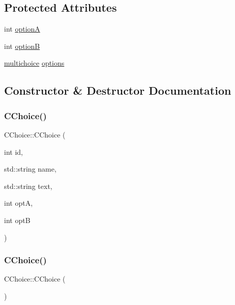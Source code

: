 \subsection*{Protected Attributes}
\begin{DoxyCompactItemize}
\item 
int \mbox{\hyperlink{class_c_choice_abca7c10fc012acfb1145ae7524050bc5}{optionA}}
\item 
int \mbox{\hyperlink{class_c_choice_a6343fc4edf568af23978d9df5f4b94b5}{optionB}}
\item 
\mbox{\hyperlink{_game_menus_8h_acdb545ed67596d0840e35ed209fecbe9}{multichoice}} \mbox{\hyperlink{class_c_choice_a80f4aa4ea3bb2ff9ae3f9e45fcc921ce}{options}}
\end{DoxyCompactItemize}


\subsection{Constructor \& Destructor Documentation}
\mbox{\label{class_c_choice_a41af6b55945769cf785d9de68fe43d6b}} 
\subsubsection{\texorpdfstring{C\+Choice()}{CChoice()}\hspace{0.1cm}{\footnotesize\ttfamily [1/2]}}
{\footnotesize\ttfamily C\+Choice\+::\+C\+Choice (\begin{DoxyParamCaption}\item[{int}]{id,  }\item[{std\+::string}]{name,  }\item[{std\+::string}]{text,  }\item[{int}]{optA,  }\item[{int}]{optB }\end{DoxyParamCaption})\hspace{0.3cm}{\ttfamily [inline]}}

\mbox{\label{class_c_choice_a5fd22c387feda4d5e050b9e0ce2bf22c}} 
\subsubsection{\texorpdfstring{C\+Choice()}{CChoice()}\hspace{0.1cm}{\footnotesize\ttfamily [2/2]}}
{\footnotesize\ttfamily C\+Choice\+::\+C\+Choice (\begin{DoxyParamCaption}{ }\end{DoxyParamCaption})\hspace{0.3cm}{\ttfamily [delete]}}



